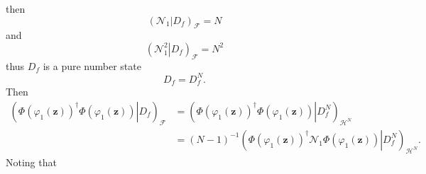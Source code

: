 \documentclass[aps,preprint]{revtex4}%
\begin{document}
then
\begin{equation}
\left(  \left.  \mathcal{N}_{1}\right\vert D_{f}\right)  _{\mathcal{F}}=N
\end{equation}
and%
\begin{equation}
\left(  \left.  \mathcal{N}_{1}^{2}\right\vert D_{f}\right)  _{\mathcal{F}%
}=N^{2}%
\end{equation}
thus $D_{f}$ is a pure number state
\begin{equation}
D_{f}=D_{f}^{N}.
\end{equation}
Then
\begin{align}
\left(  \left.  \Phi\left(  \varphi_{1}\left(  \mathbf{z}\right)  \right)
^{\dagger}\Phi\left(  \varphi_{1}\left(  \mathbf{z}\right)  \right)
\right\vert D_{f}\right)  _{\mathcal{F}}  &  =\left(  \left.  \Phi\left(
\varphi_{1}\left(  \mathbf{z}\right)  \right)  ^{\dagger}\Phi\left(
\varphi_{1}\left(  \mathbf{z}\right)  \right)  \right\vert D_{f}^{N}\right)
_{\mathcal{H}^{N}}\nonumber\\
&  =\left(  N-1\right)  ^{-1}\left(  \left.  \Phi\left(  \varphi_{1}\left(
\mathbf{z}\right)  \right)  ^{\dagger}\mathcal{N}_{1}\Phi\left(  \varphi
_{1}\left(  \mathbf{z}\right)  \right)  \right\vert D_{f}^{N}\right)
_{\mathcal{H}^{N}}.
\end{align}
Noting that
\end{document}

